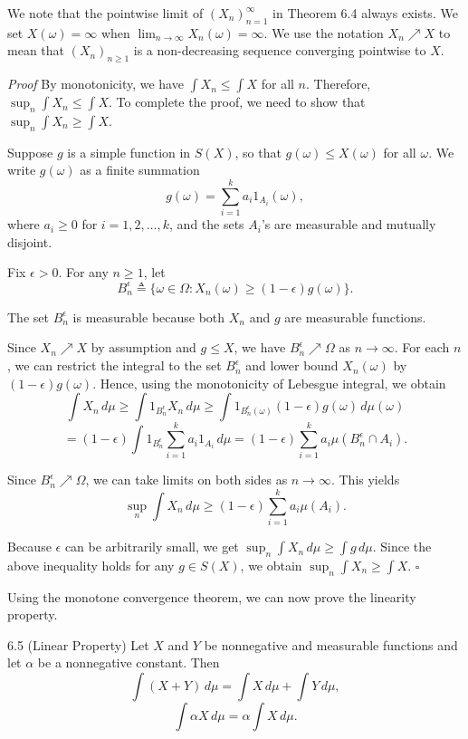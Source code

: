 We note that the pointwise limit of $(X_n)_{n=1}^{\infty}$ in Theorem 6.4 always exists. We set $X(\omega)=\infty$ when $\lim_{n\to\infty} X_n(\omega)=\infty$. We use the notation $X_n \nearrow X$ to mean that $(X_n)_{n \ge 1}$ is a non-decreasing sequence converging pointwise to $X$.

\textit{Proof} By monotonicity, we have $\int X_n \le \int X$ for all $n$. Therefore, $\sup_n \int X_n \le \int X$. To complete the proof, we need to show that $\sup_n \int X_n \ge \int X$.

Suppose $g$ is a simple function in $S(X)$, so that $g(\omega) \le X(\omega)$ for all $\omega$. We write $g(\omega)$ as a finite summation
\[
g(\omega)=\sum_{i=1}^{k} a_i 1_{A_i}(\omega),
\]
where $a_i \ge 0$ for $i=1,2,\dots,k$, and the sets $A_i$'s are measurable and mutually disjoint.

Fix $\epsilon > 0$. For any $n \ge 1$, let
\[
B_n^{\epsilon} \triangleq \{\omega \in \Omega : X_n(\omega) \ge (1-\epsilon)g(\omega)\}.
\]

The set $B_n^{\epsilon}$ is measurable because both $X_n$ and $g$ are measurable functions.

Since $X_n \nearrow X$ by assumption and $g \le X$, we have $B_n^{\epsilon} \nearrow \Omega$ as $n \to \infty$. For each $n$, we can restrict the integral to the set $B_n^{\epsilon}$ and lower bound $X_n(\omega)$ by $(1-\epsilon)g(\omega)$. Hence, using the monotonicity of Lebesgue integral, we obtain
\[
\int X_n\, d\mu \ge \int 1_{B_n^{\epsilon}} X_n\, d\mu \ge \int 1_{B_n^{\epsilon}(\omega)}(1-\epsilon)g(\omega)\, d\mu(\omega)
\]
\[
= (1-\epsilon)\int 1_{B_n^{\epsilon}} \sum_{i=1}^{k} a_i 1_{A_i}\, d\mu
= (1-\epsilon)\sum_{i=1}^{k} a_i \mu(B_n^{\epsilon} \cap A_i).
\]

Since $B_n^{\epsilon} \nearrow \Omega$, we can take limits on both sides as $n \to \infty$. This yields
\[
\sup_n \int X_n\, d\mu \ge (1-\epsilon)\sum_{i=1}^{k} a_i \mu(A_i).
\]

Because $\epsilon$ can be arbitrarily small, we get $\sup_n \int X_n\, d\mu \ge \int g\, d\mu$. Since the above inequality holds for any $g \in S(X)$, we obtain $\sup_n \int X_n \ge \int X$. \hfill $\square$

Using the monotone convergence theorem, we can now prove the linearity property.

\begin{thmbox}{6.5 (Linear Property)}
Let $X$ and $Y$ be nonnegative and measurable functions and let $\alpha$ be a nonnegative constant. Then
\[
\int (X+Y)\, d\mu = \int X\, d\mu + \int Y\, d\mu,
\]
\[
\int \alpha X\, d\mu = \alpha \int X\, d\mu.
\]
\end{thmbox}

